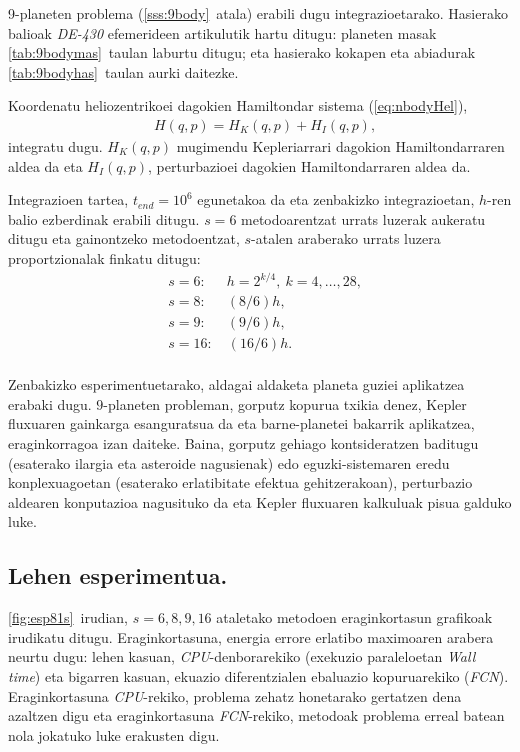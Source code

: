9-planeten problema (\ref{sss:9body}~atala) erabili dugu integrazioetarako. Hasierako balioak \emph{DE-430} efemerideen artikulutik hartu ditugu: planeten masak  \ref{tab:9bodymas}~taulan laburtu ditugu; eta hasierako kokapen eta abiadurak \ref{tab:9bodyhas}~taulan aurki daitezke.

Koordenatu heliozentrikoei dagokien  Hamiltondar sistema (\ref{eq:nbodyHel}),
\begin{align*}
&H(q,p)=H_K(q,p)+H_I(q,p),
\end{align*}
integratu dugu. $H_K(q,p)$ mugimendu Kepleriarrari dagokion Hamiltondarraren aldea da  eta $H_I(q,p)$, perturbazioei dagokien Hamiltondarraren aldea da. 

Integrazioen tartea, $t_{end}=10^6$ egunetakoa da eta zenbakizko integrazioetan, $h$-ren balio ezberdinak erabili ditugu. $s=6$ metodoarentzat urrats luzerak aukeratu ditugu eta gainontzeko metodoentzat, $s$-atalen araberako urrats luzera proportzionalak finkatu ditugu:
\begin{align*}
&s=6: \quad  \ \ h=2^{k/4}, \ k=4,\dots,28, \\
&s=8: \quad  \ \ (8/6)h, \\
&s=9: \quad  \ \ (9/6)h, \\
&s=16: \quad (16/6)h. \\
\end{align*} 

Zenbakizko esperimentuetarako, aldagai aldaketa planeta guziei aplikatzea erabaki dugu. $9$-planeten probleman, gorputz kopurua txikia denez,  Kepler fluxuaren gainkarga esanguratsua da eta  barne-planetei bakarrik aplikatzea, eraginkorragoa izan daiteke. Baina, gorputz gehiago kontsideratzen baditugu (esaterako ilargia eta asteroide nagusienak) edo eguzki-sistemaren eredu konplexuagoetan (esaterako erlatibitate efektua gehitzerakoan), perturbazio aldearen konputazioa nagusituko da eta Kepler fluxuaren kalkuluak pisua galduko luke. 


\subsection*{Lehen esperimentua.}


\ref{fig:esp81s}~irudian, $s=6,8,9,16$ ataletako metodoen eraginkortasun grafikoak irudikatu ditugu. Eraginkortasuna, energia errore erlatibo maximoaren arabera neurtu dugu: lehen kasuan, \emph{CPU}-denborarekiko (exekuzio paraleloetan \emph{Wall time}) eta bigarren kasuan, ekuazio diferentzialen ebaluazio kopuruarekiko (\emph{FCN}). Eraginkortasuna \emph{CPU}-rekiko, problema zehatz honetarako gertatzen dena azaltzen digu eta eraginkortasuna \emph{FCN}-rekiko, metodoak problema erreal batean nola jokatuko luke erakusten digu. 


